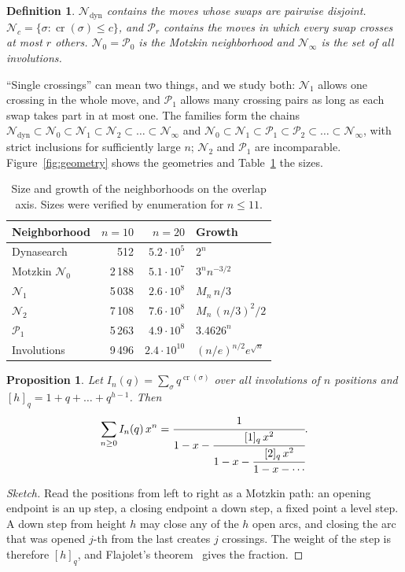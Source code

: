 \documentclass[10pt,twocolumn]{article}
\newtheorem{proposition}{Proposition}
\newtheorem{definition}{Definition}
\newcommand{\N}{\mathcal{N}}
\newcommand{\Pa}{\mathcal{P}}
\newcommand{\ncr}{\operatorname{cr}}
\begin{document}
\begin{definition}
$\N_{\mathrm{dyn}}$ contains the moves whose swaps are pairwise
disjoint. $\N_c=\{\sigma:\ncr(\sigma)\leq c\}$, and $\Pa_r$ contains the
moves in which every swap crosses at most $r$ others. $\N_0=\Pa_0$ is
the Motzkin neighborhood and $\N_\infty$ is the set of all involutions.
\end{definition}

``Single crossings'' can mean two things, and we study both: $\N_1$
allows one crossing in the whole move, and $\Pa_1$ allows many crossing
pairs as long as each swap takes part in at most one. The families form
the chains
$\N_{\mathrm{dyn}}\subset\N_0\subset\N_1\subset\N_2\subset\dots\subset\N_\infty$
and $\N_0\subset\N_1\subset\Pa_1\subset\Pa_2\subset\dots\subset\N_\infty$,
with strict inclusions for sufficiently large $n$; $\N_2$ and $\Pa_1$
are incomparable. Figure~\ref{fig:geometry} shows the geometries and
Table~\ref{tab:taxonomy} the sizes.

\begin{table}[t]
\centering
\caption{Size and growth of the neighborhoods on the overlap axis.
Sizes were verified by enumeration for $n\leq 11$.}
\label{tab:taxonomy}
\small
\begin{tabular}{@{}lrrl@{}}
\toprule
Neighborhood & $n=10$ & $n=20$ & Growth \\
\midrule
Dynasearch & 512 & $5.2{\cdot}10^5$ & $2^n$ \\
Motzkin $\N_0$ & 2\,188 & $5.1{\cdot}10^7$ & $3^n n^{-3/2}$ \\
$\N_1$ & 5\,038 & $2.6{\cdot}10^8$ & $M_n\,n/3$ \\
$\N_2$ & 7\,108 & $7.6{\cdot}10^8$ & $M_n\,(n/3)^2/2$ \\
$\Pa_1$ & 5\,263 & $4.9{\cdot}10^8$ & $3.4626^n$ \\
Involutions & 9\,496 & $2.4{\cdot}10^{10}$ & $(n/e)^{n/2}e^{\sqrt n}$ \\
\bottomrule
\end{tabular}
\end{table}

\begin{proposition}\label{prop:jfrac}
Let $I_n(q)=\sum_{\sigma}q^{\ncr(\sigma)}$ over all involutions of $n$
positions and $[h]_q=1+q+\dots+q^{h-1}$. Then
\begin{equation}
\sum_{n\geq0} I_n(q)\,x^n=
\cfrac{1}{1-x-\cfrac{[1]_q\,x^2}{1-x-\cfrac{[2]_q\,x^2}{1-x-\cdots}}}.
\end{equation}
\end{proposition}
\begin{proof}[Sketch]
Read the positions from left to right as a Motzkin path: an opening
endpoint is an up step, a closing endpoint a down step, a fixed point a
level step. A down step from height $h$ may close any of the $h$ open
arcs, and closing the arc that was opened $j$-th from the last creates
$j$ crossings. The weight of the step is therefore $[h]_q$, and
Flajolet's theorem~\cite{flajolet1980} gives the fraction.
\end{proof}
\end{document}
